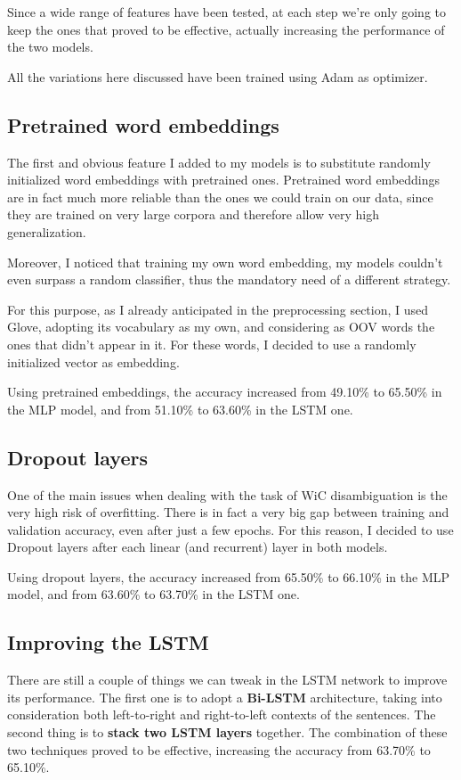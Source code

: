 \documentclass[11pt,a4paper]{article}
\begin{document}
	Since a wide range of features have been tested, at each step we're only going to keep the ones that proved to be effective, actually increasing the performance of the two models.
	
	All the variations here discussed have been trained using Adam \citep{kingma2017adam} as optimizer.
	
	\subsection{Pretrained word embeddings}
	The first and obvious feature I added to my models is to substitute randomly initialized word embeddings with pretrained ones. Pretrained word embeddings are in fact much more reliable than the ones we could train on our data, since they are trained on very large corpora and therefore allow very high generalization.
	
	Moreover, I noticed that training my own word embedding, my models couldn't even surpass a random classifier, thus the mandatory need of a different strategy.
	
	For this purpose, as I already anticipated in the preprocessing section, I used Glove, adopting its vocabulary as my own, and considering as OOV words the ones that didn't appear in it. For these words, I decided to use a randomly initialized vector as embedding.
	
	Using pretrained embeddings, the accuracy increased from 49.10\% to 65.50\% in the MLP model, and from 51.10\% to 63.60\% in the LSTM one.
	
	\subsection{Dropout layers}
	One of the main issues when dealing with the task of WiC disambiguation is the very high risk of overfitting. There is in fact a very big gap between training and validation accuracy, even after just a few epochs. For this reason, I decided to use Dropout layers \citep{JMLR:v15:srivastava14a} after each linear (and recurrent) layer in both models.
	
	Using dropout layers, the accuracy increased from 65.50\% to 66.10\% in the MLP model, and from 63.60\% to 63.70\% in the LSTM one.
	
	\subsection{Improving the LSTM}
	There are still a couple of things we can tweak in the LSTM network to improve its performance. The first one is to adopt a \textbf{Bi-LSTM} architecture, taking into consideration both left-to-right and right-to-left contexts of the sentences. The second thing is to \textbf{stack two LSTM layers} together. The combination of these two techniques proved to be effective, increasing the accuracy from 63.70\% to 65.10\%.
	
\end{document}
